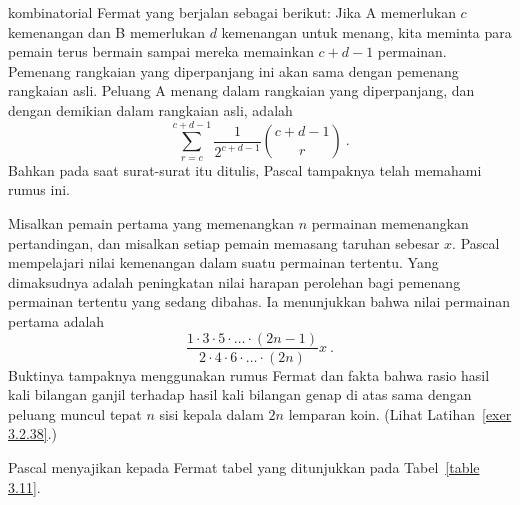 kombinatorial Fermat yang berjalan sebagai berikut: Jika A memerlukan $c$ kemenangan dan
B memerlukan $d$ kemenangan untuk menang, kita meminta para pemain terus bermain sampai
mereka memainkan $c + d - 1$ permainan.  Pemenang rangkaian yang diperpanjang ini akan
sama dengan pemenang rangkaian asli.  Peluang A menang dalam rangkaian yang diperpanjang,
dan dengan demikian dalam rangkaian asli, adalah
$$
\sum_{r = c}^{c + d - 1} \frac 1{2^{c + d - 1}} {{c + d - 1} \choose r}\ .
$$ 
Bahkan pada saat surat-surat itu ditulis, Pascal tampaknya telah memahami rumus ini.
\par Misalkan pemain pertama yang memenangkan $n$ permainan memenangkan pertandingan,
dan misalkan setiap pemain memasang taruhan sebesar $x$.  Pascal mempelajari nilai
kemenangan dalam suatu permainan tertentu.  Yang dimaksudnya adalah peningkatan nilai
harapan perolehan bagi pemenang permainan tertentu yang sedang dibahas.  Ia menunjukkan
bahwa nilai permainan pertama adalah
$$ \frac {1\cdot3\cdot5\cdot\dots\cdot(2n - 1)}{2\cdot4\cdot6\cdot\dots\cdot(2n)}x\ .
$$ 
Buktinya tampaknya menggunakan rumus Fermat dan fakta bahwa rasio hasil kali bilangan
ganjil terhadap hasil kali bilangan genap di atas sama dengan peluang muncul tepat $n$
sisi kepala dalam $2n$ lemparan koin.  (Lihat Latihan~\ref{exer 3.2.38}.)
\par
Pascal menyajikan kepada Fermat tabel yang ditunjukkan pada Tabel~\ref{table 3.11}.
\begin{table}
\centering
{}
\caption{Penyelesaian Pascal untuk masalah pembagian taruhan.}
\label{table 3.11}
\end{table}               
